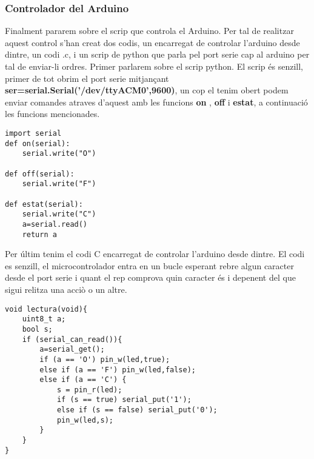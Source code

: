 \documentclass[11p]{article}
\begin{document}
\subsubsection{Controlador del Arduino}
Finalment pararem sobre el scrip que controla el Arduino. Per tal de realitzar aquest control s'han creat dos codis, un encarregat de controlar l'arduino desde dintre, un codi .c, i un scrip de python que parla pel port serie cap al arduino per tal de enviar-li ordres.
\newline
Primer parlarem sobre el scrip python. El scrip és senzill, primer de tot obrim el port serie mitjançant \textbf{ser=serial.Serial('/dev/ttyACM0',9600)}, un cop el tenim obert podem enviar comandes atraves d'aquest amb les funcions \textbf{on} , \textbf{off} i \textbf{estat}, a continuació les funcions mencionades.
\newline
\begin{lstlisting}
import serial
def on(serial):
	serial.write("O")

def off(serial):
	serial.write("F")

def estat(serial):
	serial.write("C")
	a=serial.read()
	return a

\end{lstlisting}

Per últim tenim el codi C encarregat de controlar l'arduino desde dintre. El codi es senzill, el microcontrolador entra en un bucle esperant rebre algun caracter desde el port serie i quant el rep comprova quin caracter és i depenent del que sigui relitza una acciò o un altre.
\newline
\begin{lstlisting}
void lectura(void){
	uint8_t a;
	bool s;
	if (serial_can_read()){
		a=serial_get();
		if (a == 'O') pin_w(led,true);
		else if (a == 'F') pin_w(led,false);
		else if (a == 'C') {
			s = pin_r(led);
			if (s == true) serial_put('1');
			else if (s == false) serial_put('0');
			pin_w(led,s);
		}
	}
}
\end{lstlisting}
\end{document}
